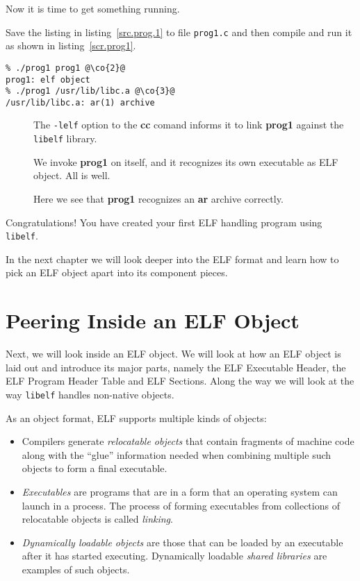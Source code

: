 \documentclass[a4paper]{book}
\makeatletter
\newcommand{\filename}[1]{\texttt{#1}}
\newcommand{\firstterm}[1]{\textit{#1}}                 %
\newcommand{\library}[1]{\texttt{#1}}
\newcommand{\parameter}[1]{\texttt{#1}}
\newcommand{\tool}[1]{\textbf{#1}}
\newenvironment{callout}[2][blue]{%
  \begingroup\newcommand{\@cocolor}{#1}%
  \newcommand{\@cogroup}[1]{#2}}{\endgroup}
\newcommand{\@co}[1]{\framebox{\textbf{\color{\@cocolor}#1}}}
\newcommand{\co}[1]{%
  \hypertarget{\@cogroup.#1.co}{%
    \hyperlink{\@cogroup.#1.cr}{\@co{#1}}}}
\newcommand{\coref}[1]{%
  \hypertarget{\@cogroup.#1.cr}{%
    \hyperlink{\@cogroup.#1.co}{\@co{#1}}}}
\makeatother
\begin{document}
Now it is time to get something running.

Save the listing in listing~\vref{src.prog.1} to file
\filename{prog1.c} and then compile and run it as shown in
listing~\vref{scr.prog1}.

\begin{callout}[red]{scr1}
  \begin{lstlisting}[basicstyle=\ttfamily, language={},
      caption=Compiling and running prog1,
      label=scr.prog1]
% cc -o prog1 prog1.c -lelf @\co{1}@
% ./prog1 prog1 @\co{2}@
prog1: elf object
% ./prog1 /usr/lib/libc.a @\co{3}@
/usr/lib/libc.a: ar(1) archive
  \end{lstlisting}

  \begin{description}
  \item[\coref{1}] The \parameter{-lelf} option to the \tool{cc} comand
    informs it to link \tool{prog1} against the \library{libelf}
    library.
  \item[\coref{2}] We invoke \tool{prog1} on itself, and it recognizes
    its own executable as ELF object.  All is well.
  \item[\coref{3}] Here we see that \tool{prog1} recognizes an \tool{ar}
    archive correctly.
  \end{description}
\end{callout}

Congratulations!  You have created your first ELF handling program
using \library{libelf}.

In the next chapter we will look deeper into the ELF format and learn
how to pick an ELF object apart into its component pieces.

\chapter{Peering Inside an ELF Object}\label{chap.peering-inside}

Next, we will look inside an ELF object.  We will look at how an ELF
object is laid out and introduce its major parts, namely the ELF
Executable Header, the ELF Program Header Table and ELF Sections.
Along the way we will look at the way \library{libelf} handles
non-native objects.

As an object format, ELF supports multiple kinds of objects:

\begin{itemize}
\item Compilers generate \firstterm{relocatable objects} that contain fragments of
  machine code along with the ``glue'' information needed when
  combining multiple such objects to form a final executable.
\item \firstterm{Executables} are programs that are in a form that an
  operating system can launch in a process.  The process of forming
  executables from collections of relocatable objects is called
  \firstterm{linking}.
\item \firstterm{Dynamically loadable objects} are those that can be
  loaded by an executable after it has started executing.  Dynamically
  loadable \firstterm{shared libraries} are examples of such objects.
\end{itemize}
\end{document}
